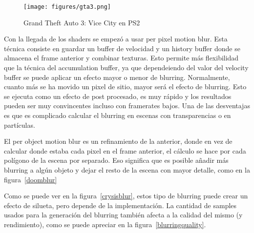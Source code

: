 \documentclass[withindex, glossary]{cam-thesis}
\begin{document}
\begin{figure}[!htbp]
    \texttt{[image: figures/gta3.png]}
    \caption{Grand Theft Auto 3: Vice City en PS2\label{gta3}}
\end{figure}

Con la llegada de los shaders se empezó a usar per pixel motion blur. Esta técnica consiste en guardar un buffer de velocidad y un history buffer donde se almacena el frame anterior y combinar texturas. Esto permite más flexibilidad que la técnica del accumulation buffer, ya que dependeiendo del valor del velocity buffer se puede aplicar un efecto mayor o menor de blurring. Normalmente, cuanto más se ha movido un pixel de sitio, mayor será el efecto de blurring. Esto se ejecuta como un efecto de post procesado, es muy rápido y los resultados pueden ser muy convincentes incluso con framerates bajos. Una de las desventajas es que es complicado calcular el blurring en escenas con transparencias o en partículas.

El per object motion blur es un refinamiento de la anterior, donde en vez de calcular donde estaba cada pixel en el frame anterior, el cálculo se hace por cada polígono de la escena por separado. Eso significa que es posible añadir más blurring a algún objeto y dejar el resto de la escena con mayor detalle, como en la figura~\ref{doomblur}

Como se puede ver en la figura~\ref{crysisblur}, estos tipo de blurring puede crear un efecto de silueta, pero depende de la implementación. La cantidad de samples usados para la generación del blurring también afecta a la calidad del mismo (y rendimiento), como se puede apreciar en la figura~\ref{blurringquality}.
\end{document}
